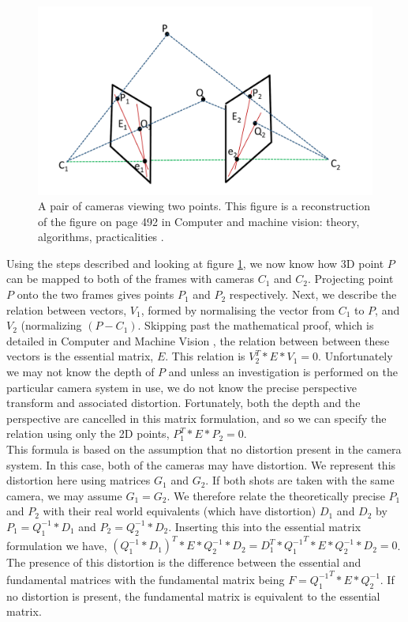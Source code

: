 \begin{figure}[t!]
	\includegraphics[width=5.0in]{images/introfm1}
	\caption{A pair of cameras viewing two points. This figure is a reconstruction of the figure on page 492 in Computer and machine vision: theory, algorithms, practicalities \cite{Davies12Computer}.}
	\label{fig:INTRO_FMA1}
\end{figure}  

Using the steps described and looking at figure \ref{fig:INTRO_FMA1}, we now know how 3D point $P$ can be mapped to both of the frames with cameras $C_1$ and $C_2$. Projecting point $P$ onto the two frames gives points $P_1$ and $P_2$ respectively. Next, we describe the relation between vectors, $V_1$, formed by normalising the vector from $C_1$ to $P$, and $V_2$ (normalizing $(P - C_1)$. Skipping past the mathematical proof, which is detailed in Computer and Machine Vision \cite{Davies12Computer}, the relation between between these vectors is the essential matrix, $E$. This relation is $V_2^{T} * E * V_1 = 0$. Unfortunately we may not know the depth of $P$ and unless an investigation is performed on the particular camera system in use, we do not know the precise perspective transform and associated distortion. Fortunately, both the depth and the perspective are cancelled in this matrix formulation, and so we can specify the relation using only the 2D points, $P_1^T * E * P_2 = 0$. \\

This formula is based on the assumption that no distortion present in the camera system. In this case, both of the cameras may have distortion. We represent this distortion here using matrices $G_1$ and $G_2$. If both shots are taken with the same camera, we may assume $G_1 = G_2$. We therefore relate the theoretically precise $P_1$ and $P_2$ with their real world equivalents (which have distortion) $D_1$ and $D_2$ by $P_1 = Q_1^{-1} * D_1$ and $P_2 = Q_2^{-1} * D_2$. Inserting this into the essential matrix formulation we have, $(Q_1^{-1} * D_1)^T * E * Q_2^{-1} * D_2 = D_{1}^{T} * {Q_1^{-1}}^{T} * E * Q_2^{-1} * D_2 = 0$. The presence of this distortion is the difference between the essential and fundamental matrices with the fundamental matrix being $F = {Q_1^{-1}}^{T} * E * Q_2^{-1}$. If no distortion is present, the fundamental matrix is equivalent to the essential matrix. \\

